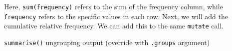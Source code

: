 \documentclass[]{tufte-book}
\newenvironment{Shaded}{}{}
\newcommand{\DataTypeTok}[1]{\textcolor[rgb]{0.56,0.13,0.00}{#1}}
\newcommand{\KeywordTok}[1]{\textcolor[rgb]{0.00,0.44,0.13}{\textbf{#1}}}
\newcommand{\NormalTok}[1]{#1}
\newcommand{\OperatorTok}[1]{\textcolor[rgb]{0.40,0.40,0.40}{#1}}
\newcommand{\StringTok}[1]{\textcolor[rgb]{0.25,0.44,0.63}{#1}}
\begin{document}
Here, \texttt{sum(frequency)} refers to the sum of the frequency column, while \texttt{frequency} refers to the specific values in each row. Next, we will add the cumulative relative frequency. We can add this to the same \texttt{mutate} call.

\begin{Shaded}
\end{Shaded}

\texttt{summarise()} ungrouping output (override with \texttt{.groups} argument)
\end{document}
